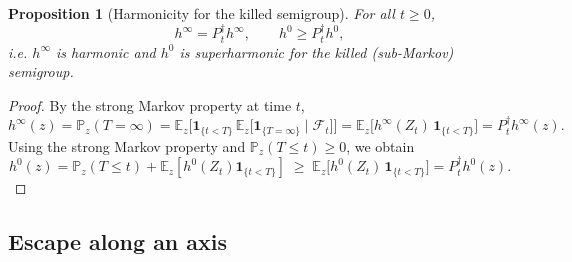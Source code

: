 \documentclass[11pt]{article}
\newcommand\citeS[1]{\cite{#1}}
\newtheorem{prop}[thm]{Proposition}
\theoremstyle{definition}
\begin{document}
\begin{prop}[Harmonicity for the killed semigroup]
For all $t\ge0$,
\[
h^\infty = P_t^\dagger h^\infty,
\qquad
h^0 \ge P_t^\dagger h^0,
\]
i.e. $h^\infty$ is harmonic and $h^0$ is superharmonic for the killed
(sub-Markov) semigroup. 
\end{prop}
\begin{proof}
By the strong Markov property at time $t$,
\[
h^\infty(z)=\mathbb{P}_z(T=\infty)
=\mathbb{E}_z\!\Big[\mathbf{1}_{\{t<T\}}\,
\mathbb{E}_z\!\big[\mathbf{1}_{\{T=\infty\}}\mid \mathcal{F}_t\big]\Big]
=
\mathbb{E}_z\!\big[h^\infty(Z_t)\,\mathbf{1}_{\{t<T\}}\big]=P_t^\dagger h^\infty(z).
\]
Using the strong Markov property and $\mathbb{P}_z(T\le t)\ge 0$,
we obtain
$$h^0(z)=\mathbb{P}_z(T\le t)+\mathbb{E}_z[h^0(Z_t)\mathbf{1}_{\{t<T\}}]\;\ge\;\mathbb{E}_z\!\big[h^0(Z_t)\,\mathbf{1}_{\{t<T\}}\big]
= P_t^\dagger h^0(z).$$
\end{proof}


\subsection{Escape along an axis}
\label{subsec:levyfuite}
\end{document}
